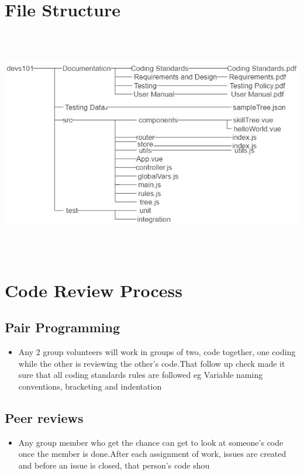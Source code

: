 \documentclass[12pt]{article}
\begin{document}
	\section{File Structure}
	\includegraphics[width=15cm, height=10cm]{filestructure.jpg}\\ 
	
	\section{Code Review Process}
	\subsection{Pair Programming}
	\begin{itemize}
	\item Any 2 group volunteers will work in groups of two, code together, one coding while the other is 		reviewing the other's code.That follow up check made it sure that all coding standards rules are 			followed eg Variable naming conventions, bracketing and indentation
	\end{itemize}
	
	\subsection{Peer reviews}
	\begin{itemize}
	\item Any group member who get the chance can get to look at someone's code once the member is done.After each assignment of work, issues are created and before an issue is closed, that person's code shou
	\end{itemize}
\end{document}
